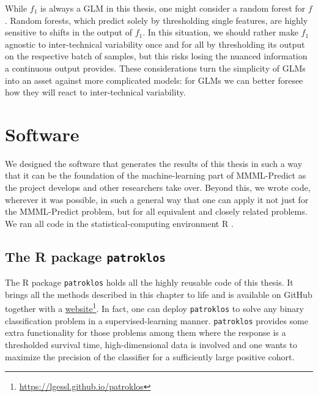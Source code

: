 While $f_1$ is always a GLM in this thesis, one might consider a random forest for $f$. Random 
forests, which predict solely by thresholding single features, are highly sensitive to shifts in 
the output of $f_1$. In this situation, we should rather make $f_1$ agnostic to inter-technical 
variability once and 
for all by thresholding its output on the respective batch of samples, but this risks losing the 
nuanced information a continuous output provides. These considerations turn the simplicity of GLMs 
into an asset against more complicated models: for GLMs we can better foresee how they will react 
to inter-technical variability.

\section{Software}

We designed the software that generates the results of this thesis in such a way that it 
can be the foundation of the machine-learning part of MMML-Predict as the project develops and 
other researchers take over. Beyond this, we wrote code, wherever it was possible, in such 
a general way that one can apply it not just for the MMML-Predict problem, but for all equivalent 
and closely related problems. We ran all code in the statistical-computing environment R
\cite{r-language}.

\subsection{The R package \texttt{patroklos}}
The R package \texttt{patroklos} holds all the highly reusable code of this thesis. It brings 
all the methods described in this chapter to life and is available on GitHub \cite{patroklos-gh} 
together with a 
\href{https://lgessl.github.io/patroklos/}{website}\footnote{\url{https://lgessl.github.io/patroklos}}. 
In fact, one can deploy 
\texttt{patroklos} to solve any binary classification problem in a supervised-learning manner.
\texttt{patroklos} provides some extra functionality for those problems among them where the 
response is a thresholded survival time, high-dimensional data is involved and one wants to maximize 
the precision of the classifier for a sufficiently large positive cohort.

